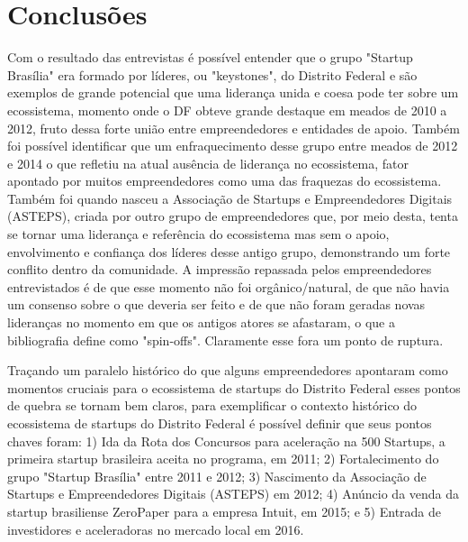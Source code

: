 \chapter[Conclusões]{Conclusões}
\label{cap-conclusoes}

Com o resultado das entrevistas é possível entender que o grupo "Startup Brasília" era formado por líderes, ou "keystones", do Distrito Federal e são exemplos de grande potencial que uma liderança unida e coesa pode ter sobre um ecossistema, momento onde o DF obteve grande destaque em meados de 2010 a 2012, fruto dessa forte união entre empreendedores e entidades de apoio. Também foi possível identificar que um enfraquecimento desse grupo entre meados de 2012 e 2014 o que refletiu na atual ausência de liderança no ecossistema, fator apontado por muitos empreendedores como uma das fraquezas do ecossistema. Também foi quando nasceu a Associação de Startups e Empreendedores Digitais (ASTEPS), criada por outro grupo de empreendedores que, por meio desta, tenta se tornar uma liderança e referência do ecossistema mas sem o apoio, envolvimento e confiança dos líderes desse antigo grupo, demonstrando um forte conflito dentro da comunidade. A impressão repassada pelos empreendedores entrevistados é de que esse momento não foi orgânico/natural, de que não havia um consenso sobre o que deveria ser feito e de que não foram geradas novas lideranças no momento em que os antigos atores se afastaram, o que a bibliografia define como "spin-offs". Claramente esse fora um ponto de ruptura.


Traçando um paralelo histórico do que alguns empreendedores apontaram como momentos cruciais para o ecossistema de startups do Distrito Federal esses pontos de quebra se tornam bem claros, para exemplificar o contexto histórico do ecossistema de startups do Distrito Federal é possível definir que seus pontos chaves foram: 1) Ida da Rota dos Concursos para aceleração na 500 Startups, a primeira startup brasileira aceita no programa, em 2011; 2) Fortalecimento do grupo "Startup Brasília" entre 2011 e 2012; 3) Nascimento da Associação de Startups e Empreendedores Digitais (ASTEPS) em 2012; 4) Anúncio da venda da startup brasiliense ZeroPaper para a empresa Intuit, em 2015; e 5) Entrada de investidores e aceleradoras no mercado local em 2016. 

